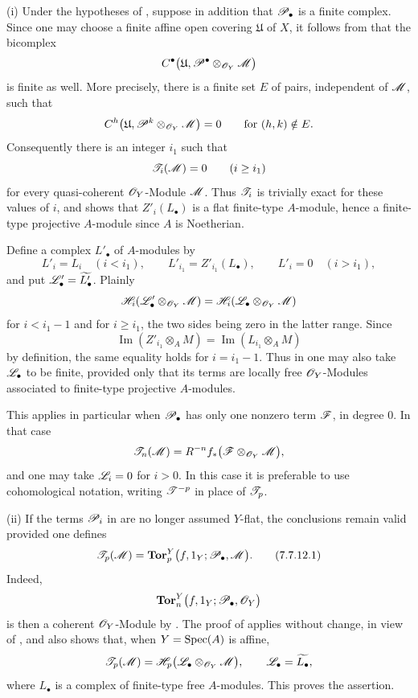 \begin{remarks}[7.7.12]
\label{III.7.7.12}
\textnormal{(i)}
Under the hypotheses of , suppose in
addition that $\mathscr{P}_\bullet$ is a finite complex.  Since
one may choose a finite affine open covering $\mathfrak U$
of $X$, it follows from  that the
bicomplex
\[
  C^\bullet
  \bigl(
    \mathfrak U,
    \mathscr{P}^\bullet\otimes_{\mathscr{O}_Y}\mathscr{M}
  \bigr)
\]
is finite as well.  More precisely, there is a finite set
$E$ of pairs, independent of $\mathscr{M}$, such that
\[
  C^h
  \bigl(
    \mathfrak U,
    \mathscr{P}^k\otimes_{\mathscr{O}_Y}\mathscr{M}
  \bigr)
  =0
  \qquad\text{for }(h,k)\notin E.
\]
Consequently there is an integer $i_1$ such that
\[
  \mathscr{T}_i(\mathscr{M})=0
  \qquad(i\geq i_1)
\]
for every quasi-coherent $\mathscr{O}_Y$-Module $\mathscr{M}$.  Thus
$\mathscr{T}_i$ is trivially exact for these values of $i$, and
 shows that $Z'_i(L_\bullet)$ is a flat
finite-type $A$-module, hence a finite-type projective
$A$-module since $A$ is Noetherian.

Define a complex $L'_\bullet$ of $A$-modules by
\[
  L'_i=L_i\quad(i<i_1),
  \qquad
  L'_{i_1}=Z'_{i_1}(L_\bullet),
  \qquad
  L'_i=0\quad(i>i_1),
\]
and put $\mathscr{L}'_\bullet=\widetilde{L'_\bullet}$.  Plainly
\[
  \mathscr{H}_i
  (\mathscr{L}'_\bullet\otimes_{\mathscr{O}_Y}\mathscr{M})
  =
  \mathscr{H}_i
  (\mathscr{L}_\bullet\otimes_{\mathscr{O}_Y}\mathscr{M})
\]
for $i<i_1-1$ and for $i\geq i_1$, the two sides being zero
in the latter range.  Since
\[
  \operatorname{Im}
  (Z'_{i_1}\otimes_A M)
  =
  \operatorname{Im}
  (L_{i_1}\otimes_A M)
\]
by definition, the same equality holds for $i=i_1-1$.
Thus in  one may also take
$\mathscr{L}_\bullet$ to be finite, provided only that its terms
are locally free $\mathscr{O}_Y$-Modules associated to
finite-type projective $A$-modules.

This applies in particular when $\mathscr{P}_\bullet$ has only
one nonzero term $\mathscr{F}$, in degree $0$.  In that case
\[
  \mathscr{T}_n(\mathscr{M})
  =
  R^{-n}f_*
  \bigl(\mathscr{F}\otimes_{\mathscr{O}_Y}\mathscr{M}\bigr),
\]
and one may take $\mathscr{L}_i=0$ for $i>0$.  In this case it is
preferable to use cohomological notation, writing
$\mathscr{T}^{-p}$ in place of $\mathscr{T}_p$.

\medskip
\textnormal{(ii)}
If the terms $\mathscr{P}_i$ in  are no longer
assumed $Y$-flat, the conclusions remain valid provided one
defines
\[
  \mathscr{T}_p(\mathscr{M})
  =
  \mathbf{Tor}^Y_p
  \bigl(f,1_Y;\mathscr{P}_\bullet,\mathscr{M}\bigr).
  \tag{7.7.12.1}\label{III.7.7.12.1}
\]
Indeed,
\[
  \mathbf{Tor}^Y_n
  \bigl(f,1_Y;\mathscr{P}_\bullet,\mathscr{O}_Y\bigr)
\]
is then a coherent $\mathscr{O}_Y$-Module by
.  The proof of  applies
without change, in view of , and also shows
that, when $Y=\operatorname{Spec}(A)$ is affine,
\[
  \mathscr{T}_p(\mathscr{M})
  =
  \mathscr{H}_p
  \bigl(
    \mathscr{L}_\bullet\otimes_{\mathscr{O}_Y}\mathscr{M}
  \bigr),
  \qquad
  \mathscr{L}_\bullet=\widetilde{L_\bullet},
\]
where $L_\bullet$ is a complex of finite-type free
$A$-modules.  This proves the assertion.
\end{remarks}
